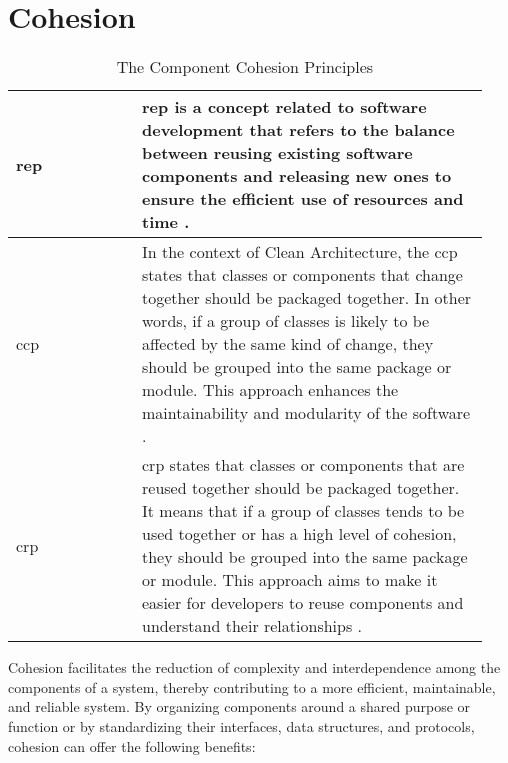\chapter{Cohesion} \label{appendix_cohesion_principles}

\begin{table}[H]
    \begin{tabular}{ p{0.25\linewidth} | p{0.69\linewidth}}
        \toprule
        \acrlong{rep} & \acrshort{rep} is a concept related to software development that
        refers to the balance between reusing existing software components and releasing
        new ones to ensure the efficient use of resources and time
        \parencite[104]{robert_c_martin_clean_2018}.\\ \midrule 
        
        \acrlong{ccp} & In the context of Clean Architecture, the \acrshort{ccp} states
        that classes or components that change together should be packaged together. In
        other words, if a group of classes is likely to be affected by the same kind of
        change, they should be grouped into the same package or module. This approach
        enhances the maintainability and modularity of the software
        \parencite[105]{robert_c_martin_clean_2018}.\\ \midrule 
        
        \acrlong{crp} & \acrshort{crp} states that classes or components that are reused
        together should be packaged together. It means that if a group of classes tends to
        be used together or has a high level of cohesion, they should be grouped into the
        same package or module. This approach aims to make it easier for developers to
        reuse components and understand their relationships
        \parencite[107]{robert_c_martin_clean_2018}.\\

        \bottomrule
    \end{tabular}
    \caption{The Component Cohesion Principles}
    \label{appendix_tab_cohesion_principles}
\end{table}

Cohesion facilitates the reduction of complexity and interdependence among the components
of a system, thereby contributing to a more efficient, maintainable, and reliable system.
By organizing components around a shared purpose or function or by standardizing their
interfaces, data structures, and protocols, cohesion can offer the following benefits:

